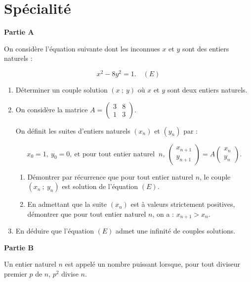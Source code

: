 \documentclass{cornouaille}
\begin{document}
\section{Spécialité}
\begin{exercice}[Spécialité][5]


\textbf{Partie A}

\medskip

On considère l'équation suivante dont les inconnues $x$ et $y$ sont des entiers naturels :

\[x^2 - 8y^2 = 1 . \quad(E)\]

\medskip

\begin{enumerate}
\item Déterminer un couple solution $(x~;~y)$ où $x$ et $y$ sont deux entiers naturels.
\item  On considère la matrice $A = \begin{pmatrix}3&8\\1&3\end{pmatrix}$.

On définit les suites d'entiers naturels $\left(x_n\right)$ et $\left(y_n\right)$ par :

\[x_0 = 1,\: y_0 = 0,\: \text{et pour tout entier naturel }\:n,\: \begin{pmatrix}x_{n+1}\\y_{n+1}\end{pmatrix} = A\begin{pmatrix}x_{n}\\y_{n}\end{pmatrix}.\]
	\begin{enumerate}
		\item Démontrer par récurrence que pour tout entier naturel $n$, le couple 
		$\left(x_n~;~y_n\right)$ est solution de l'équation $(E)$.
		\item En admettant que la suite $\left(x_n\right)$ est à valeurs strictement positives, démontrer que pour tout entier naturel $n$, on a : $x_{n+1} > x_n$.
 	\end{enumerate}
\item  En déduire que l'équation $(E)$ admet une infinité de couples solutions.
\end{enumerate}

\bigskip

\textbf{Partie B}

\medskip

Un entier naturel $n$ est appelé un nombre puissant lorsque, pour tout diviseur premier $p$ de $n$,\: $p^2$ divise $n$.


\end{exercice}
\end{document}
